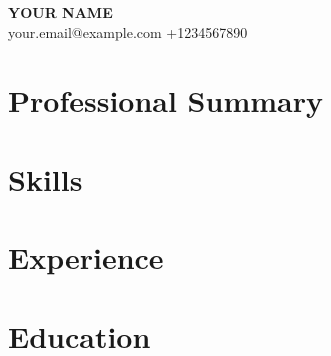 \documentclass[11pt,a4paper]{article}
\begin{document}
\begin{center}
    \textbf{\Large YOUR NAME} \\
    your.email@example.com \quad +1234567890
\end{center}

\section*{Professional Summary}

\section*{Skills}

\section*{Experience}

\section*{Education}
\end{document}
